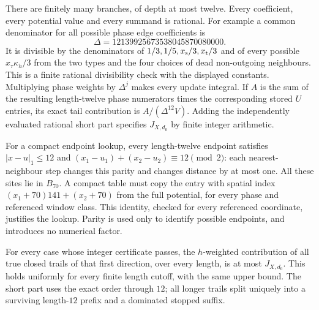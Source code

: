 There are finitely many branches, of depth at most twelve.
Every coefficient, every potential value and every summand is
rational. For example a common denominator for all possible phase
edge coefficients is
\[
 \Delta=12139925673538045870080000.
\]
It is divisible by the denominators of \(1/3,1/5,x_{\rm s}/3,
x_{\rm t}/3\) and of every possible
\(x_\tau\kappa_h/3\) from the two types and the four choices of
dead non-outgoing neighbours. This is a finite rational divisibility
check with the displayed constants. Multiplying phase weights by
\(\Delta^j\) makes every update integral. If \(A\) is the sum
of the resulting length-twelve phase numerators times the
corresponding stored \(U\) entries, its exact tail contribution is
\(A/(\Delta^{12}V)\). Adding the independently evaluated rational
short part specifies \(J_{X,d_0}\) by finite integer arithmetic.

For a compact endpoint lookup, every length-twelve endpoint satisfies
\(|x-u|_1\le12\) and
\((x_1-u_1)+(x_2-u_2)\equiv12\pmod2\): each nearest-neighbour
step changes this parity and changes distance by at most one.
All these sites lie in \(B_{70}\). A compact table must copy the
entry with spatial index
\((x_1+70)141+(x_2+70)\) from the full potential, for every phase
and referenced window class. This identity, checked for every
referenced coordinate, justifies the lookup. Parity is used only
to identify possible endpoints, and introduces no numerical factor.

\begin{lemma}\label{l:prefix-domination}
For every case whose integer certificate passes, the \(h\)-weighted
contribution of all true closed trails of that first direction,
over every length, is at most \(J_{X,d_0}\).
This holds uniformly for every finite length cutoff, with the same
upper bound. The short part uses the exact order through \(12\);
all longer trails split uniquely into a surviving length-\(12\)
prefix and a dominated stopped suffix.
\end{lemma}

